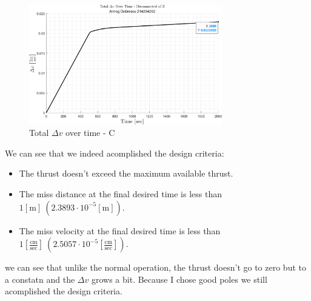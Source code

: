 \documentclass[11pt, a4paper]{article}
\begin{document}
\begin{figure}[H]
    \centering
    \includegraphics[width=0.75\textwidth]{images/graph8.png}
    \caption{Total $\Delta v$ over time - C}
    \label{fig:delta_v_over_time-caseC}
\end{figure}
We can see that we indeed acomplished the design criteria:
\begin{itemize}
    \item The thrust doesn't exceed the maximum available thrust.
    \item The miss distance at the final desired time is less than $1[\mathrm{m}]\ \left(2.3893\cdot10^{-5}\left[\mathrm{m}\right]\right)$.
    \item The miss velocity at the final desired time is less than $1\left[\displaystyle\frac{\mathrm{cm}}{\mathrm{sec}}\right]\ \left(2.5057\cdot10^{-5}\left[\displaystyle\frac{\mathrm{cm}}{\mathrm{sec}}\right]\right)$.
\end{itemize}

we can see that unlike the normal operation, the thrust doesn't go to zero but to a constatn and the $\Delta v$ grows a bit. Because I chose good poles we still acomplished the design criteria.
\end{document}
